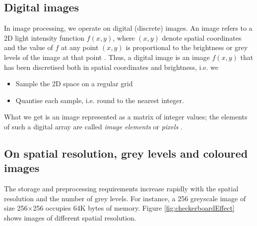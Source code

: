 \subsection{Digital images}

In image processing, we operate on digital (discrete) images.
An image refers to a 2D light intensity function \( f(x,y) \), where \( (x,y) \) denote spatial coordinates and the value of \( f \) at any point \( (x,y) \) is proportional to the brightness or grey levels of the image at that point \cite{imagProcFundamentals}.
Thus, a digital image is an image \( f(x,y)  \) that has been discretised both in spatial coordinates and brightness, i.e. we

\begin{itemize}
	\item Sample the 2D space on a regular grid
	\item Quantise each sample, i.e. round to the nearest integer.
\end{itemize}

What we get is an image represented as a matrix of integer values; the elements of such a digital array are called \textit{image elements} or \textit{pixels} \cite{pydata2018}.




\subsection{On spatial resolution, grey levels and coloured images}

The storage and preprocessing requirements increase rapidly with the spatial resolution and the number of grey levels. 
For instance, a 256 greyscale image of size 256\( \times \)256 occupies 64K bytes of memory. Figure \ref{fig:checkerboardEffect} shows images of different spatial resolution. 

